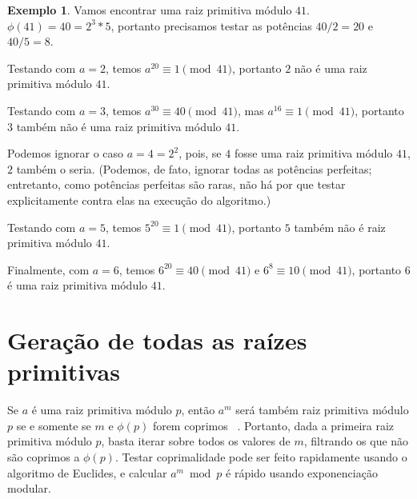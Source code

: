 \documentclass{article}
\theoremstyle{definition}
\newtheorem{example}{Exemplo}
\begin{document}
\begin{example}
    Vamos encontrar uma raiz primitiva módulo $41$.
    $\phi(41) = 40 = 2^3*5$,
    portanto precisamos testar as potências $40/2 = 20$ e $40/5 = 8$.

    Testando com $a = 2$, temos $a^{20} \equiv 1 \pmod{41}$,
    portanto $2$ não é uma raiz primitiva módulo $41$.

    Testando com $a = 3$, temos $a^{30} \equiv 40 \pmod{41}$,
    mas $a^{16} \equiv 1 \pmod{41}$,
    portanto $3$ também não é uma raiz primitiva módulo $41$.

    Podemos ignorar o caso $a = 4 = 2^2$,
    pois, se $4$ fosse uma raiz primitiva módulo $41$,
    $2$ também o seria.
    (Podemos, de fato, ignorar todas as potências perfeitas;
    entretanto,
    como potências perfeitas são raras,
    não há por que testar explicitamente contra elas na execução do algoritmo.)

    Testando com $a = 5$, temos $5^{20} \equiv 1 \pmod{41}$,
    portanto $5$ também não é raiz primitiva módulo $41$.

    Finalmente, com $a = 6$, temos $6^{20} \equiv 40 \pmod{41}$
    e $6^8 \equiv 10 \pmod{41}$,
    portanto $6$ é uma raiz primitiva módulo $41$.
\end{example}

\section{Geração de todas as raízes primitivas}

Se $a$ é uma raiz primitiva módulo $p$,
então $a^m$ será também raiz primitiva módulo $p$
se e somente se $m$ e $\phi(p)$ forem coprimos%
~\cite{PrimitiveRootsStackOverflow}.
Portanto,
dada a primeira raiz primitiva módulo $p$,
basta iterar sobre todos os valores de $m$,
filtrando os que não são coprimos a $\phi(p)$.
Testar coprimalidade pode ser feito rapidamente usando o algoritmo de Euclides,
e calcular $a^m \bmod p$ é rápido usando exponenciação modular.
\end{document}
